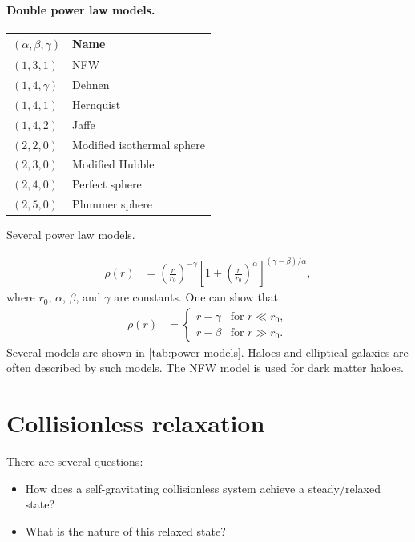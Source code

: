 \paragraph*{Double power law models.}
\begin{margintable}
	\footnotesize
	\begin{tabular}{ll}
		\toprule
		$(\alpha, \beta, \gamma)$ & Name\\
		\midrule
		$(1,3,1)$ & NFW\\
		$(1,4,\gamma)$ & Dehnen\\
		$(1,4,1)$ & Hernquist\\
		$(1,4,2)$ & Jaffe\\
		$(2,2,0)$ & Modified isothermal sphere\\
		$(2,3,0)$ & Modified Hubble\\
		$(2,4,0)$ & Perfect sphere\\
		$(2,5,0)$ & Plummer sphere\\
		\bottomrule
	\end{tabular}
	\caption{Several power law models.}
	\label{tab:power-models}
\end{margintable}
\begin{align*}
	\rho(r)
	&= \left( \frac{r}{r_0} \right)^{-\gamma}
	\left[ 1 + \left(\frac{r}{r_0}  \right)^\alpha \right]^{(\gamma-\beta)/\alpha},
\end{align*}
where $r_0$, $\alpha$, $\beta$, and $\gamma$ are constants.
One can show that
\begin{align*}
	\rho(r)
	&=
	\begin{cases}
		r - \gamma & \text{for } r \ll r_0,\\
		r - \beta & \text{for } r \gg r_0.
	\end{cases}
\end{align*}
Several models are shown in \cref{tab:power-models}.
Haloes and elliptical galaxies are often described by such models.
The NFW model is used for dark matter haloes.














\section{Collisionless relaxation}
There are several questions:
\begin{itemize}
	\item How does a self-gravitating collisionless system achieve a steady/relaxed state?
	\item What is the nature of this relaxed state?
\end{itemize}

